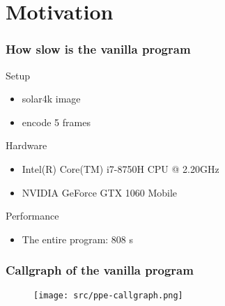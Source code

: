 \section{Motivation}

\begin{frame}
  \frametitle{How slow is the vanilla program}
  \begin{block}{Setup}
    \begin{itemize}
    \item<+-> solar4k image
    \item<+-> encode 5 frames
    \end{itemize}
  \end{block}
  \onslide<+->
  \begin{exampleblock}{Hardware}
    \begin{itemize}
    \item Intel(R) Core(TM) i7-8750H CPU @ 2.20GHz
    \item NVIDIA GeForce GTX 1060 Mobile
    \end{itemize}
  \end{exampleblock}
  \onslide<+->
  \begin{alertblock}{Performance}
    \begin{itemize}
    \item The entire program: 808 s
    \end{itemize}
  \end{alertblock}
\end{frame}

\begin{frame}
  \frametitle{Callgraph of the vanilla program}
  \begin{figure}[h]
    \centering \texttt{[image: src/ppe-callgraph.png]}
  \end{figure}
\end{frame}

